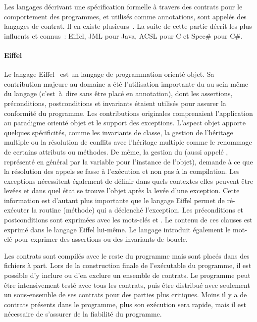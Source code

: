 Les langages décrivant une spécification formelle à travers des contrats pour le
comportement des programmes, et utilisés comme annotations, sont appelés des
{\strong langages de contrat}. Il en existe plusieurs~.
La suite de cette partie décrit les plus influents et connus~: Eiffel, JML pour
Java, ACSL pour C et Spec\# pour C\#.

\paragraph{Eiffel} Le langage Eiffel~ est un langage de
programmation orienté objet. Sa contribution majeure au domaine a été
l'utilisation importante du  au sein même du
langage (c'est~à~dire sans être placé en annotation), dont les assertions,
préconditions, postconditions et invariants étaient utilisés pour assurer la
conformité du programme. Les contributions originales comprenaient l'application
au paradigme orienté objet et le support des exceptions. L'aspect objet apporte
quelques spécificités, comme les invariants de classe, la gestion de l'héritage
multiple ou la résolution de conflits avec l'héritage multiple comme le
renommage de certains attributs ou méthodes. De même, la gestion du
 (aussi appelé , représenté
en général par la variable  pour l'instance de l'objet), demande à ce
que la résolution des appels se fasse à l'exécution et non pas à la compilation.
Les exceptions nécessitent également de définir dans quels contextes elles
peuvent être levées et dans quel état se trouve l'objet après la levée d'une
exception. Cette information est d'autant plus importante que le langage Eiffel
permet de ré-exécuter la routine (méthode) qui a déclenché l'exception. Les
préconditions et postconditions sont exprimées avec les mots-clés 
et . Le contenu de ces clauses est exprimé dans le langage Eiffel
lui-même. Le langage introduit également le mot-clé  pour exprimer
des assertions ou des invariants de boucle.

Les contrats sont compilés avec le reste du programme mais sont placés dans des
fichiers à part. Lors de la construction finale de l'exécutable du programme, il
est possible d'y inclure ou d'en exclure un ensemble de contrats. Le programme
peut être intensivement testé avec tous les contrats, puis être distribué avec
seulement un sous-ensemble de ses contrats pour des parties plus critiques.
Moins il y a de contrats présents dans le programme, plus son exécution sera
rapide, mais il est nécessaire de s'assurer de la fiabilité du programme.

